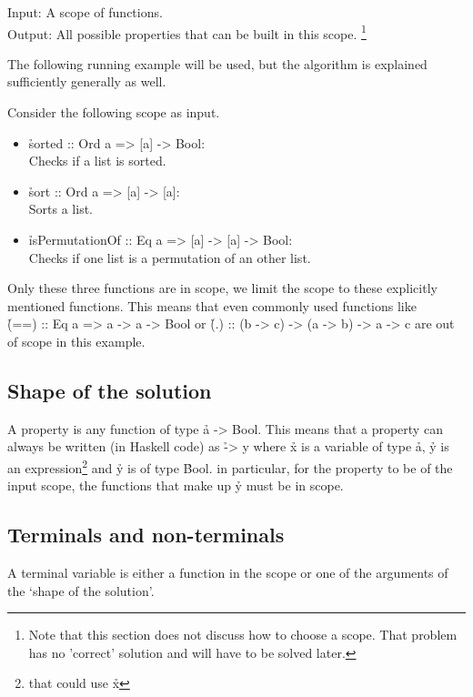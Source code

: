 \documentclass[a4paper, 11pt, onepage]{article}
\begin{document}
Input: A scope of functions.\\
Output: All possible properties that can be built in this scope.
\footnote{
  Note that this section does not discuss how to choose a scope.
  That problem has no 'correct' solution and will have to be solved later.
}

The following running example will be used, but the algorithm is explained sufficiently generally as well.

Consider the following scope as input.

\begin{itemize}
  \item \h{sorted :: Ord a => [a] -> Bool}:\\ Checks if a list is sorted.
  \item \h{sort :: Ord a => [a] -> [a]}:\\ Sorts a list.
  \item \h{isPermutationOf :: Eq a => [a] -> [a] -> Bool}:\\ Checks if one list is a permutation of an other list.
\end{itemize}

Only these three functions are in scope, we limit the scope to these explicitly mentioned functions.
This means that even commonly used functions like\\ \h{(==) :: Eq a => a -> a -> Bool} or \h{(.) :: (b -> c) -> (a -> b) -> a -> c} are out of scope in this example.


\subsection{Shape of the solution}

A property is any function of type \h{a -> Bool}.
This means that a property can always be written (in Haskell code) as \h{\x -> y} where \h{x} is a variable of type \h{a}, \h{y} is an expression\footnote{that could use \h{x}} and \h{y} is of type \h{Bool}.
in particular, for the property to be of the input scope, the functions that make up \h{y} must be in scope.


\subsection{Terminals and non-terminals}

\begin{de}
  A terminal variable is either a function in the scope or one of the arguments of the `shape of the solution'.
\end{de}
\end{document}
